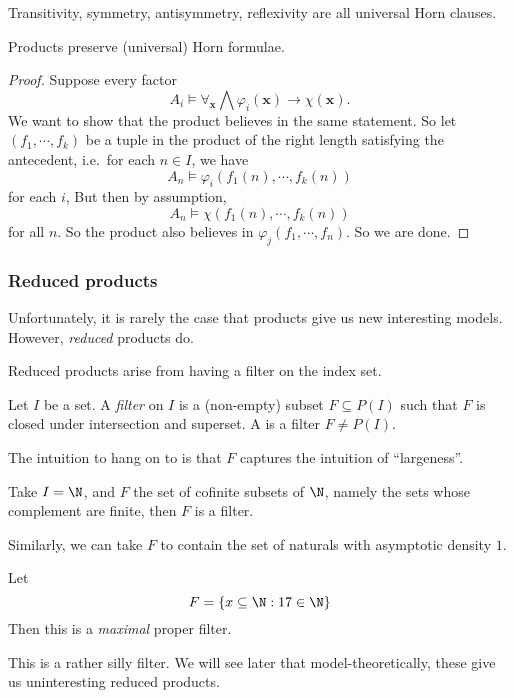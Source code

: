 \documentclass[a4paper]{article}
\begin{document}
\begin{eg}
  Transitivity, symmetry, antisymmetry, reflexivity are all universal Horn clauses.
\end{eg}

\begin{prop}
  Products preserve (universal) Horn formulae.
\end{prop}

\begin{proof}
  Suppose every factor
  \[
    A_i \vDash \forall_{\mathbf{x}} \bigwedge \varphi_i(\mathbf{x}) \to \chi(\mathbf{x}).
  \]
  We want to show that the product believes in the same statement. So let $(f_1, \cdots, f_k)$ be a tuple in the product of the right length satisfying the antecedent, i.e.\ for each $n \in I$, we have
  \[
    A_n \vDash \varphi_i (f_1(n), \cdots, f_k(n))
  \]
  for each $i$, But then by assumption,
  \[
    A_n \vDash \chi(f_1(n), \cdots, f_k(n))
  \]
  for all $n$. So the product also believes in $\varphi_j(f_1, \cdots, f_n)$. So we are done.
\end{proof}

\subsubsection*{Reduced products}
Unfortunately, it is rarely the case that products give us new interesting models. However, \emph{reduced} products do.

Reduced products arise from having a filter on the index set.
\begin{defi}[Filter]
  Let $I$ be a set. A \emph{filter} on $I$ is a (non-empty) subset $F \subseteq P(I)$ such that $F$ is closed under intersection and superset. A  is a filter $F \not= P(I)$.
\end{defi}

The intuition to hang on to is that $F$ captures the intuition of ``largeness''.
\begin{eg}
  Take $I = \N$, and $F$ the set of cofinite subsets of $\N$, namely the sets whose complement are finite, then $F$ is a filter.

  Similarly, we can take $F$ to contain the set of naturals with asymptotic density $1$.
\end{eg}

\begin{eg}
  Let
  \[
    F = \{x \subseteq \N: 17 \in \N\}
  \]
  Then this is a \emph{maximal} proper filter.
\end{eg}
This is a rather silly filter. We will see later that model-theoretically, these give us uninteresting reduced products.
\end{document}
